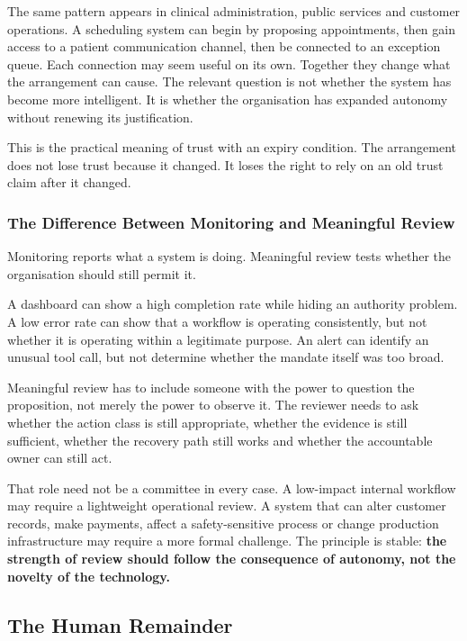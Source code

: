 The same pattern appears in clinical administration, public services and
customer operations. A scheduling system can begin by proposing
appointments, then gain access to a patient communication channel, then
be connected to an exception queue. Each connection may seem useful on
its own. Together they change what the arrangement can cause. The
relevant question is not whether the system has become more intelligent.
It is whether the organisation has expanded autonomy without renewing
its justification.

This is the practical meaning of trust with an expiry condition. The
arrangement does not lose trust because it changed. It loses the right
to rely on an old trust claim after it changed.

\subsubsection{The Difference Between Monitoring and Meaningful
Review}\label{the-difference-between-monitoring-and-meaningful-review}

Monitoring reports what a system is doing. Meaningful review tests
whether the organisation should still permit it.

A dashboard can show a high completion rate while hiding an authority
problem. A low error rate can show that a workflow is operating
consistently, but not whether it is operating within a legitimate
purpose. An alert can identify an unusual tool call, but not determine
whether the mandate itself was too broad.

Meaningful review has to include someone with the power to question the
proposition, not merely the power to observe it. The reviewer needs to
ask whether the action class is still appropriate, whether the evidence
is still sufficient, whether the recovery path still works and whether
the accountable owner can still act.

That role need not be a committee in every case. A low-impact internal
workflow may require a lightweight operational review. A system that can
alter customer records, make payments, affect a safety-sensitive process
or change production infrastructure may require a more formal challenge.
The principle is stable: \textbf{the strength of review should follow
the consequence of autonomy, not the novelty of the technology.}

\subsection{The Human Remainder}\label{the-human-remainder}

